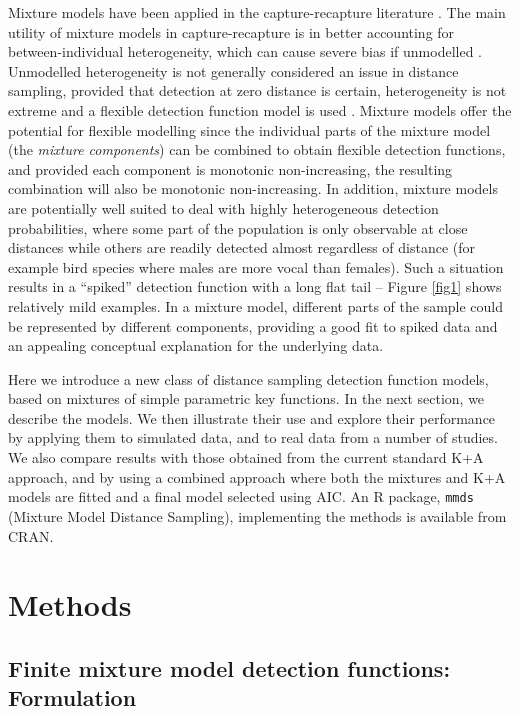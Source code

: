 \documentclass[10pt]{article}
\begin{document}
Mixture models have been applied in the capture-recapture literature \cite{Pledger:2000tc, Dorazio:2003uf, Pledger:2005wy, Morgan:2008wy}. The main utility of mixture models in capture-recapture is in better accounting for between-individual heterogeneity, which can cause severe bias if unmodelled \cite{Link:2003wo}. Unmodelled heterogeneity is not generally considered an issue in distance sampling, provided that detection at zero distance is certain, heterogeneity is not extreme and a flexible detection function model is used \cite[Section 11.12]{Buckland:2004ts}. Mixture models offer the potential for flexible modelling since the individual parts of the mixture model (the \textit{mixture components}) can be combined to obtain flexible detection functions, and provided each component is monotonic non-increasing, the resulting combination will also be monotonic non-increasing. In addition, mixture models are potentially well suited to deal with highly heterogeneous detection probabilities, where some part of the population is only observable at close distances while others are readily detected almost regardless of distance (for example bird species where males are more vocal than females). Such a situation results in a ``spiked'' detection function with a long flat tail -- Figure \ref{fig1} shows relatively mild examples. In a mixture model, different parts of the sample could be represented by different components, providing a good fit to spiked data and an appealing conceptual explanation for the underlying data.

Here we introduce a new class of distance sampling detection function models, based on mixtures of simple parametric key functions.  In the next section, we describe the models.  We then illustrate their use and explore their performance by applying them to simulated data, and to real data from a number of studies. We also compare results with those obtained from the current standard K+A approach, and by using a combined approach where both the mixtures and K+A models are fitted and a final model selected using AIC. An \textsf{R} \cite{Team:2013wf} package, \texttt{mmds} \cite{mmds} (Mixture Model Distance Sampling), implementing the methods is available from CRAN.

\section*{Methods}

\subsection*{Finite mixture model detection functions: Formulation}
\end{document}
